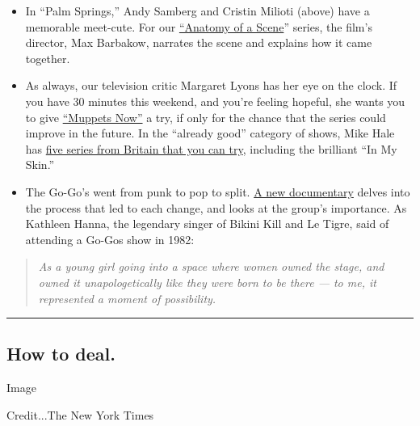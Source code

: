 \begin{itemize}
\item
  In ``Palm Springs,'' Andy Samberg and Cristin Milioti (above) have a
  memorable meet-cute. For our
  \href{https://www.nytimes3xbfgragh.onion/2020/07/31/movies/palm-springs-clip-hulu.html}{``Anatomy
  of a Scene}'' series, the film's director, Max Barbakow, narrates the
  scene and explains how it came together.
\item
  As always, our television critic Margaret Lyons has her eye on the
  clock. If you have 30 minutes this weekend, and you're feeling
  hopeful, she wants you to give
  \href{https://www.nytimes3xbfgragh.onion/2020/07/30/arts/television/muppets-disney-errol-morris-first-person.html}{``Muppets
  Now''} a try, if only for the chance that the series could improve in
  the future. In the ``already good'' category of shows, Mike Hale has
  \href{https://www.nytimes3xbfgragh.onion/2020/07/30/arts/television/in-my-skin-hulu.html}{five
  series from Britain that you can try}, including the brilliant ``In My
  Skin.''
\item
  The Go-Go's went from punk to pop to split.
  \href{https://www.nytimes3xbfgragh.onion/2020/07/29/arts/music/the-go-gos-documentary.html}{A
  new documentary} delves into the process that led to each change, and
  looks at the group's importance. As Kathleen Hanna, the legendary
  singer of Bikini Kill and Le Tigre, said of attending a Go-Gos show in
  1982:
\end{itemize}

\begin{quote}
\emph{As a young girl going into a space where women owned the stage,
and owned it unapologetically like they were born to be there --- to me,
it represented a moment of possibility.}
\end{quote}

\begin{center}\rule{0.5\linewidth}{\linethickness}\end{center}

\hypertarget{how-to-deal}{%
\subsection{How to deal.}\label{how-to-deal}}

Image

Credit...The New York Times

